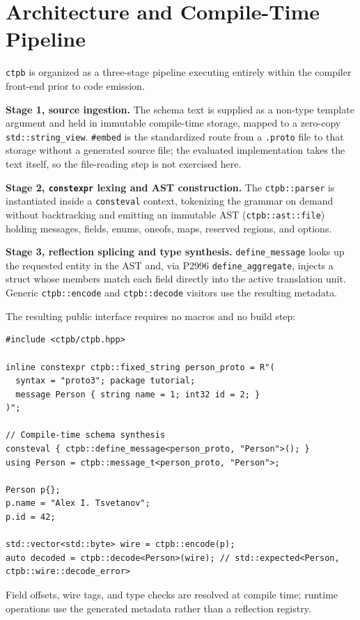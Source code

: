 \section{Architecture and Compile-Time Pipeline}

\texttt{ctpb} is organized as a three-stage pipeline executing entirely within the compiler front-end prior to code emission.

\textbf{Stage 1, source ingestion.} The schema text is supplied as a non-type template argument and held in immutable compile-time storage, mapped to a zero-copy \texttt{std::string\_view}. \texttt{\#embed} is the standardized route from a \texttt{.proto} file to that storage without a generated source file; the evaluated implementation takes the text itself, so the file-reading step is not exercised here.

\textbf{Stage 2, \texttt{constexpr} lexing and AST construction.} The \texttt{ctpb::parser} is instantiated inside a \texttt{consteval} context, tokenizing the grammar on demand without backtracking and emitting an immutable AST (\texttt{ctpb::ast::file}) holding messages, fields, enums, oneofs, maps, reserved regions, and options.

\textbf{Stage 3, reflection splicing and type synthesis.} \texttt{define\_message} looks up the requested entity in the AST and, via P2996 \texttt{define\_aggregate}, injects a struct whose members match each field directly into the active translation unit. Generic \texttt{ctpb::encode} and \texttt{ctpb::decode} visitors use the resulting metadata.

The resulting public interface requires no macros and no build step:

\begin{lstlisting}[language=ModernC++, caption={User API in \texttt{ctpb}}]
#include <ctpb/ctpb.hpp>

inline constexpr ctpb::fixed_string person_proto = R"(
  syntax = "proto3"; package tutorial;
  message Person { string name = 1; int32 id = 2; }
)";

// Compile-time schema synthesis
consteval { ctpb::define_message<person_proto, "Person">(); }
using Person = ctpb::message_t<person_proto, "Person">;

Person p{};
p.name = "Alex I. Tsvetanov";
p.id = 42;

std::vector<std::byte> wire = ctpb::encode(p);
auto decoded = ctpb::decode<Person>(wire); // std::expected<Person, ctpb::wire::decode_error>
\end{lstlisting}

Field offsets, wire tags, and type checks are resolved at compile time; runtime operations use the generated metadata rather than a reflection registry.
